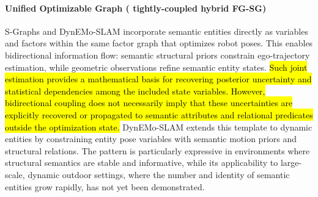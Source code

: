 \paragraph{Unified Optimizable Graph ( tightly-coupled hybrid FG-SG)}
S-Graphs \cite{bavle_s-graphs_2025} and DynEMo-SLAM \cite{giberna_dynemo-slam_2025} incorporate semantic entities directly as variables and factors within the same factor graph that optimizes robot poses. 
This enables bidirectional information flow: semantic structural priors constrain ego-trajectory estimation, while geometric observations refine semantic entity states. 
\hl{Such joint estimation provides a mathematical basis for recovering posterior uncertainty and statistical dependencies among the included state variables. 
However, bidirectional coupling does not necessarily imply that these uncertainties are explicitly recovered or propagated to semantic attributes and relational predicates outside the optimization state.}
DynEMo-SLAM extends this template to dynamic entities by constraining entity pose variables with semantic motion priors and structural relations. 
The pattern is particularly expressive in environments where structural semantics are stable and informative, while its applicability to large-scale, dynamic outdoor settings, where the number and identity of semantic entities grow rapidly, has not yet been demonstrated.

